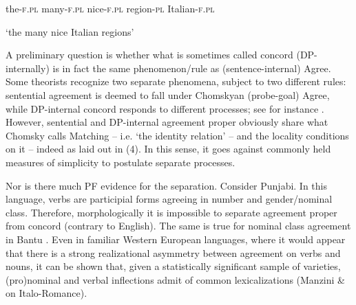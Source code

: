 \documentclass[output=paper]{langsci/langscibook}
\begin{document}
\begin{styleSfondomedioiColorexxi}
  the-\textsc{f.pl}   many-\textsc{f.pl}   nice-\textsc{f.pl}   region-\textsc{pl}    Italian-\textsc{f.pl} 
\end{styleSfondomedioiColorexxi}

\begin{styleSfondomedioiColorexxi}
  ‘the many nice Italian regions’
\end{styleSfondomedioiColorexxi}

\begin{styleSfondomedioiColorexxi}
A preliminary question is whether what is sometimes called concord (DP-internally) is in fact the same phenomenon/rule as (sentence-internal) Agree. Some theorists recognize two separate phenomena, subject to two different rules: sentential agreement is deemed to fall under Chomskyan (probe-goal) Agree, while DP-internal concord responds to different processes; see for instance \citet{Giusti2008}. However, sentential and DP-internal agreement proper obviously share what Chomsky calls Matching – i.e. ‘the identity relation’ – and the locality conditions on it – indeed as laid out in (4). In this sense, it goes against commonly held measures of simplicity to postulate separate processes. 
\end{styleSfondomedioiColorexxi}

\begin{styleSfondomedioiColorexxi}
Nor is there much PF evidence for the separation. Consider Punjabi. In this language, verbs are participial forms agreeing in number and gender/nominal class. Therefore, morphologically it is impossible to separate agreement proper from concord (contrary to English). The same is true for nominal class agreement in Bantu \citep{Baker2008}. Even in familiar Western European languages, where it would appear that there is a strong realizational asymmetry between agreement on verbs and nouns, it can be shown that, given a statistically significant sample of varieties, (pro)nominal and verbal inflections admit of common lexicalizations (Manzini \& \citealt{Savoia2007} on Italo-Romance).
\end{styleSfondomedioiColorexxi}
\end{document}
